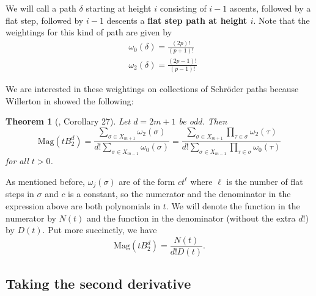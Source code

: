 \documentclass[11pt]{article}
\theoremstyle{definition}
\theoremstyle{definition}
\theoremstyle{plain}
\newtheorem{theo}{Theorem}
\theoremstyle{plain}
\theoremstyle{plain}
\theoremstyle{definition}
\begin{document}
We will call a path $\delta$ starting at height $i$ consisting of $i-1$ ascents, followed by a flat step, followed by $i-1$ descents a \textbf{flat step path at height $i$}. Note that the weightings for this kind of path are given by
\begin{align*}
&\omega_0(\delta) = \frac{(2p)!}{(p+1)!} \\
&\omega_2(\delta) = \frac{(2p-1)!}{(p-1)!}
\end{align*}

We are interested in these weightings on collections of Schröder paths because Willerton in \cite{willerton_magnitude_2017} showed the following:

\begin{theo}[\cite{willerton_magnitude_2017}, Corollary 27]
Let $d = 2m+1$ be odd. Then
\begin{equation*}
\text{Mag}\left(tB_2^d\right) = \frac{\sum\limits_{\sigma\in X_{m+1}}\omega_2(\sigma)}{d!\sum\limits_{\sigma\in X_{m-1}}\omega_0(\sigma)} = \frac{\sum\limits_{\sigma\in X_{m+1}}\prod\limits_{\tau\in\sigma}\omega_2(\tau)}{d!\sum\limits_{\sigma\in X_{m-1}}\prod\limits_{\tau\in\sigma}\omega_0(\tau)}
\end{equation*}
for all $t > 0$.
\end{theo}
As mentioned before, $\omega_j(\sigma)$ are of the form $ct^\ell$ where $\ell$ is the number of flat steps in $\sigma$ and $c$ is a constant, so the numerator and the denominator in the expression above are both polynomials in $t$. We will denote the function in the numerator by $N(t)$ and the function in the denominator (without the extra $d!$) by $D(t)$. Put more succinctly, we have
\begin{equation*}
\text{Mag}\left(tB_2^d\right) = \frac{N(t)}{d!D(t)}.
\end{equation*}

\subsection*{Taking the second derivative}
\end{document}
